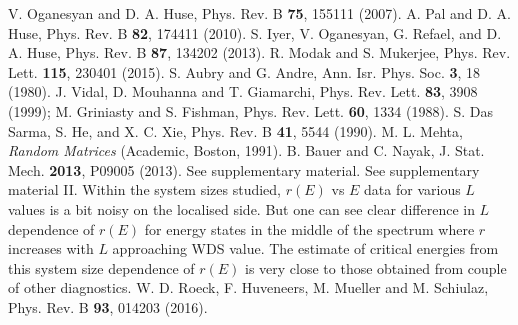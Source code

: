 \documentclass[prl,aps,twocolumn,floats,nofootinbib,showpacs]{revtex4}
\begin{document}
\begin{thebibliography}{99}
V. Oganesyan  and  D. A. Huse, Phys. Rev. B {\bf 75}, 155111 (2007). 
A. Pal and D. A. Huse, Phys. Rev. B {\bf 82}, 174411 (2010). 
S. Iyer, V. Oganesyan, G. Refael, and D. A. Huse, Phys. Rev. B {\bf 87}, 134202 (2013).
R. Modak and S. Mukerjee, Phys. Rev. Lett. {\bf 115}, 230401 (2015).
S. Aubry and G. Andre, Ann. Isr. Phys. Soc. {\bf 3}, 18 (1980).
J. Vidal, D. Mouhanna and T. Giamarchi, Phys. Rev. Lett. {\bf 83}, 3908 (1999); 
M. Griniasty and S. Fishman, Phys. Rev. Lett. {\bf{60}}, 1334 (1988).
S. Das Sarma, S. He, and X. C. Xie, Phys. Rev. B {\bf 41}, 5544 (1990).
M. L. Mehta, {\it Random Matrices} (Academic, Boston, 1991).
B. Bauer and C. Nayak, J. Stat. Mech. {\bf 2013}, P09005 (2013).
See supplementary material.
See supplementary material II.
 Within the system sizes studied, $r(E)$ vs $E$ data for various $L$ values is a bit noisy on the localised side.
But one can see clear difference in $L$ dependence of $r(E)$ for energy states in the middle of the spectrum where $r$ increases with $L$ approaching WDS value.
The estimate of critical energies from this system size dependence of $r(E)$ is very close to those obtained from couple of other diagnostics. 
W. D. Roeck, F. Huveneers, M. Mueller and M. Schiulaz, Phys. Rev. B {\bf 93}, 014203 (2016).
\end{thebibliography}
\end{document}
